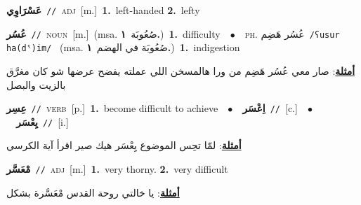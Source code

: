 \documentclass[10pt,a4paper,twoside]{article} %
\begin{document}
\begin{multicols}{2}
{\setlength\topsep{0pt}\textbf{\foreignlanguage{arabic}{عَسْرَاوِي}}\ {\color{gray}\texttt{//}\color{black}}\ \textsc{adj}\ [m.]\ \textbf{1.}~left-handed  \textbf{2.}~lefty\ } \vspace{2mm}

{\setlength\topsep{0pt}\textbf{\foreignlanguage{arabic}{عُسُر}}\ {\color{gray}\texttt{//}\color{black}}\ \textsc{noun}\ [m.]\ \color{gray}(msa. \foreignlanguage{arabic}{صُعُوبَة}~\foreignlanguage{arabic}{\textbf{١.}})\color{black}\ \textbf{1.}~difficulty\ \ $\bullet$\ \ \textsc{ph.} \color{gray} \foreignlanguage{arabic}{عُسُر هَضِم}\color{black}\ {\color{gray}\texttt{/{\sffamily ʕusur ha(dˤ)im}/}\color{black}}\ \color{gray} (msa. \foreignlanguage{arabic}{صُعُوبَة في الهضم}~\foreignlanguage{arabic}{\textbf{١.}})\color{black}\ \textbf{1.}~indigestion\  \begin{flushright}\color{gray}\foreignlanguage{arabic}{\textbf{\underline{\foreignlanguage{arabic}{أمثلة}}}: صار معي عُسُر هَضِم من ورا هالمسخن اللي عملته يفضح عرضها شو كان مغرَّق بالزيت والبصل}\end{flushright}\color{black}} \vspace{2mm}

{\setlength\topsep{0pt}\textbf{\foreignlanguage{arabic}{عِسِر}}\ {\color{gray}\texttt{//}\color{black}}\ \textsc{verb}\ [p.]\ \textbf{1.}~become difficult to achieve\ \ $\bullet$\ \ \setlength\topsep{0pt}\textbf{\foreignlanguage{arabic}{اِعْسَر}}\ {\color{gray}\texttt{//}\color{black}}\ [c.]\ \ $\bullet$\ \ \setlength\topsep{0pt}\textbf{\foreignlanguage{arabic}{يِعْسَر}}\ {\color{gray}\texttt{//}\color{black}}\ [i.]\  \begin{flushright}\color{gray}\foreignlanguage{arabic}{\textbf{\underline{\foreignlanguage{arabic}{أمثلة}}}: لمّا تحِس الموضوع يِعْسَر هيك صير اقرأ آية الكرسي}\end{flushright}\color{black}} \vspace{2mm}

{\setlength\topsep{0pt}\textbf{\foreignlanguage{arabic}{مْعَسَّر}}\ {\color{gray}\texttt{//}\color{black}}\ \textsc{adj}\ [m.]\ \textbf{1.}~very thorny.  \textbf{2.}~very difficult\  \begin{flushright}\color{gray}\foreignlanguage{arabic}{\textbf{\underline{\foreignlanguage{arabic}{أمثلة}}}: يا خالتي روحة القدس مْعَسَّرة بشكل}\end{flushright}\color{black}} \vspace{2mm}


\end{multicols}
\end{document}
